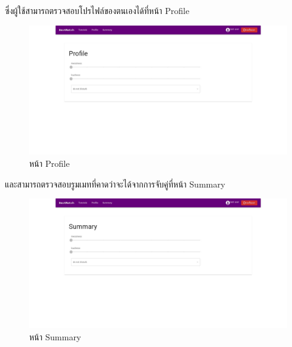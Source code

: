 %
ซึ่งผู้ใช้สามารถตรวจสอบโปรไฟล์ของตนเองได้ที่หน้า Profile
\begin{figure}[h]
  \begin{center}
    \includegraphics[width=\linewidth]{photo/web/student/profile.jpeg}
  \end{center}
  \caption{หน้า Profile}
\end{figure}
%
\newline
และสามารถตรวจสอบรูมเมทที่คาดว่าจะได้จากการจับคู่ที่หน้า Summary
\begin{figure}[h]
  \begin{center}
    \includegraphics[width=\linewidth]{photo/web/student/summary.jpeg}
  \end{center}
  \caption{หน้า Summary}
\end{figure}